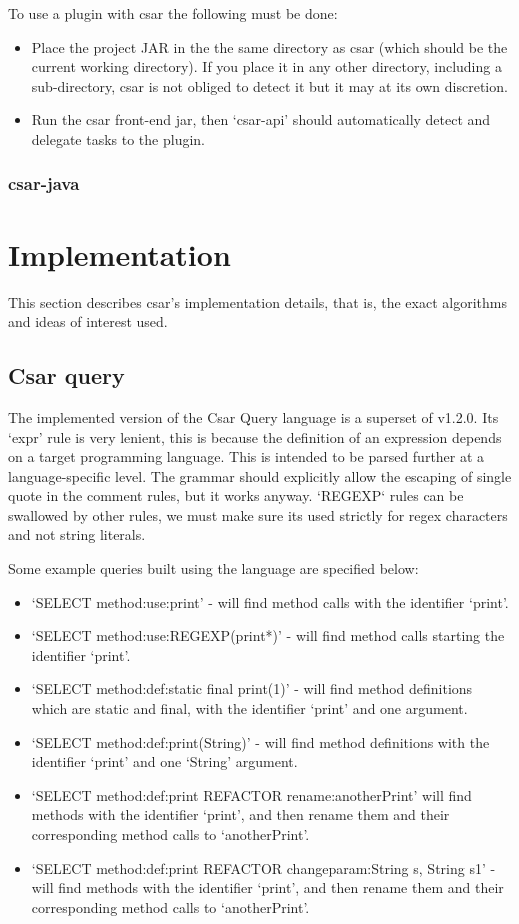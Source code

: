 \documentclass[12pt, letterpaper]{article}
\begin{document}
To use a plugin with csar the following must be done:
\begin{itemize}
  \item Place the project JAR in the the same directory as csar (which should be the current working directory).
  If you place it in any other directory, including a sub-directory, csar is not obliged to detect it but it may at its own discretion.
  \item Run the csar front-end jar, then `csar-api' should automatically detect and delegate tasks to the plugin.
\end{itemize}

\subsubsection{csar-java}

\section{Implementation}
This section describes csar's implementation details, that is, the exact algorithms and ideas of interest used.

\subsection{Csar query}
The implemented version of the Csar Query language is a superset of v1.2.0.
Its `expr' rule is very lenient, this is because the definition of an expression depends on a target programming language. 
This is intended to be parsed further at a language-specific level.
The grammar should explicitly allow the escaping of single quote in the comment rules, but it works anyway.
`REGEXP` rules can be swallowed by other rules, we must make sure its used strictly for regex characters and not string literals.

Some example queries built using the language are specified below:
\begin{itemize}
  \item `SELECT method:use:print' - will find method calls with the identifier `print'.
  \item `SELECT method:use:REGEXP(print*)' - will find method calls starting the identifier `print'.
  \item `SELECT method:def:static final print(1)' - will find method definitions which are static and final, with the identifier `print' and one argument.
  \item `SELECT method:def:print(String)' - will find method definitions with the identifier `print' and one `String' argument.
  \item `SELECT method:def:print REFACTOR rename:anotherPrint' will find methods with the identifier `print', and then rename them and their corresponding method calls to `anotherPrint'.
  \item `SELECT method:def:print REFACTOR changeparam:String s, String s1' - will find methods with the identifier `print', and then rename them and their corresponding method calls to `anotherPrint'.
\end{itemize}
\end{document}
